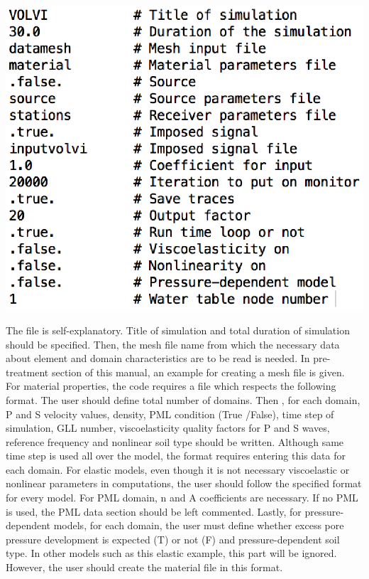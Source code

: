 \begin{center}
\leavevmode
\includegraphics [scale=0.75] {figures/inputspec.eps} 
\label{inputspec} 
\vspace{1cm}
\end{center}


The file is self-explanatory. Title of simulation and total duration of simulation should be specified. Then, the mesh file name from which the necessary data about element and domain characteristics are to be read is needed. In pre-treatment section of this manual, an example for creating a mesh file is given. \\

For material properties, the code requires a file which respects the following format. The user should define total number of domains. Then , for each domain, P and S velocity values, density, PML condition (True \slash False), time step of simulation, GLL number, viscoelasticity quality factors for P and S waves, reference frequency and nonlinear soil type should be written. Although same time step is used all over the model, the format requires entering this data for each domain. For elastic models, even though it is not necessary viscoelastic or nonlinear parameters in computations, the user should follow the specified format for every model. For PML domain, n and A coefficients are necessary.  If no PML is used, the PML data section should be left commented. Lastly, for pressure-dependent models, for each domain, the user must define whether excess pore pressure development is expected (T) or not (F) and pressure-dependent soil type. In other models such as this elastic example, this part will be ignored. However, the user should create the material file in this format. \\

